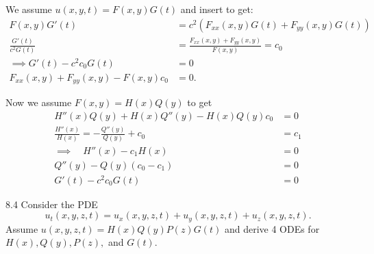 \begin{derivation}
  We assume $u(x,y,t) = F(x,y) G(t)$ and insert to get:
  \begin{align*}
    F(x,y) G'(t) &= c^2 \left( F_{x x} (x,y) G(t) + F_{yy} (x,y) G(t) \right) \\
    \frac{G'(t)}{c^2 G(t)} &= \frac{F_{x x}(x,y) + F_{yy}(x,y)}{F(x,y)} = c_0 \\
    \implies G'(t) - c^2 c_0 G(t) &= 0 \\
    F_{x x}(x,y) + F_{yy}(x,y) - F(x,y) c_0 &= 0
  .\end{align*}
  
  Now we assume $F(x,y) = H(x)Q(y)$ to get
  \begin{align*}
    H''(x) Q(y) + H(x) Q''(y) - H(x)Q(y) c_0 &= 0 \\
    \frac{H''(x)}{H(x)} = - \frac{Q''(y)}{Q(y)} + c_0 &= c_1 \\
    \implies \quad H''(x) - c_1 H(x) &= 0 \\
    Q''(y) - Q(y)(c_0 - c_1) &= 0 \\
    G'(t) - c^2 c_0 G(t) &= 0
  \end{align*}
\end{derivation}



\begin{problem}{8.4}
  Consider the PDE
  \[ 
  u_t(x,y,z,t) = u_x(x,y,z,t) + u_y(x,y,z,t) + u_z(x,y,z,t)
  .\]
  Assume $u(x,y,z,t) = H(x)Q(y)P(z)G(t)$ and derive 4 ODEs for $H(x), Q(y), P(z),$ and $G(t)$.
\end{problem}


